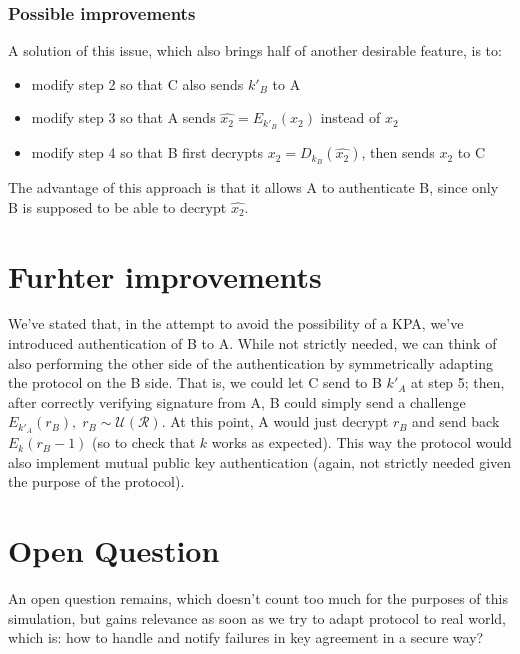 \documentclass[a4paper,12pt,titlepage]{article}
\begin{document}
\subsubsection*{Possible improvements}
A solution of this issue, which also brings half of another desirable feature,
is to:
\begin{itemize}
  \item modify step 2 so that C also sends $k'_B$ to A
  \item modify step 3 so that A sends $\hat{x_2} = E_{k'_B}(x_2)$ instead of $x_2$
  \item modify step 4 so that B first decrypts $x_2 = D_{k_B}(\hat{x_2})$, then
  sends $x_2$ to C
\end{itemize}
The advantage of this approach is that it allows A to authenticate B, since
only B is supposed to be able to decrypt $\hat{x_2}$.

\section{Furhter improvements}
We've stated that, in the attempt to avoid the possibility of a KPA, we've
introduced authentication of B to A. While not strictly needed, we can think of
also performing the other side of the authentication by symmetrically adapting
the protocol on the B side. That is, we could let C send to B $k'_A$ at step 5;
then, after correctly verifying signature from A, B could simply send a
challenge $E_{k'_A}(r_B),\; r_B \sim \mathcal{U}(\mathcal{R})$. At this point,
A would just decrypt $r_B$ and send back $E_k(r_B - 1)$ (so to check that $k$
works as expected). This way the protocol would also implement mutual public
key authentication (again, not strictly needed given the purpose of the
protocol).

\section{Open Question}
An open question remains, which doesn't count too much for the purposes of this
simulation, but gains relevance as soon as we try to adapt protocol to real
world, which is: how to handle and notify failures in key agreement in a secure
way?
\end{document}
